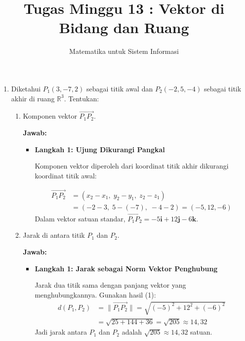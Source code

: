 \documentclass[10pt,a4paper]{article}
\title{Tugas Minggu 13 : Vektor di Bidang dan Ruang}
\author{Matematika untuk Sistem Informasi}
\date{}
\newcounter{eqblock}
\newcommand{\reseteq}{%
  \stepcounter{eqblock}%
  \setcounter{equation}{0}%
  \renewcommand{\theHequation}{\arabic{eqblock}.\arabic{equation}}%
}
\begin{document}
\maketitle

\begin{enumerate}

\item Diketahui $P_1(3, -7, 2)$ sebagai titik awal dan $P_2(-2, 5, -4)$ sebagai titik akhir di ruang $\mathbb{R}^3$. Tentukan:
\begin{enumerate}

\item Komponen vektor $\overrightarrow{P_1P_2}$.

\textbf{Jawab:}
\begin{itemize}
\item \textbf{Langkah 1: Ujung Dikurangi Pangkal}

Komponen vektor diperoleh dari koordinat titik akhir dikurangi koordinat titik awal:
\reseteq
\begin{align}
\overrightarrow{P_1P_2} &= (x_2 - x_1,\; y_2 - y_1,\; z_2 - z_1) \nonumber \\
&= (-2 - 3,\; 5 - (-7),\; -4 - 2) = (-5, 12, -6)
\end{align}
Dalam vektor satuan standar, $\overrightarrow{P_1P_2} = -5\mathbf{i} + 12\mathbf{j} - 6\mathbf{k}$.
\end{itemize}

\item Jarak di antara titik $P_1$ dan $P_2$.

\textbf{Jawab:}
\begin{itemize}
\item \textbf{Langkah 1: Jarak sebagai Norm Vektor Penghubung}

Jarak dua titik sama dengan panjang vektor yang menghubungkannya. Gunakan hasil (1):
\begin{align}
d(P_1, P_2) &= \|\overrightarrow{P_1P_2}\| = \sqrt{(-5)^2 + 12^2 + (-6)^2} \nonumber \\
&= \sqrt{25 + 144 + 36} = \sqrt{205} \approx 14{,}32
\end{align}
Jadi jarak antara $P_1$ dan $P_2$ adalah $\sqrt{205} \approx 14{,}32$ satuan.
\end{itemize}

\end{enumerate}


\end{enumerate}
\end{document}
